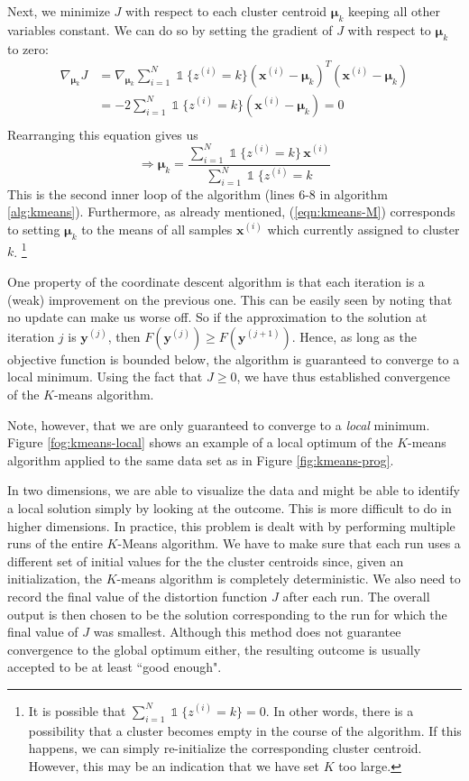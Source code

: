 \documentclass[final,3p,times,twocolumn]{elsarticle}
\let\bs\boldsymbol
\DeclareMathOperator*{\id}{\mathds{1}}
\begin{document}
Next, we minimize $J$ with respect to each cluster centroid $\bs\mu_k$ keeping all other variables constant.
We can do so by setting the gradient of $J$ with respect to $\bs\mu_k$ to zero:
\begin{equation}
\label{eqn:kmeans-M0}
\begin{split}
\nabla_{\bs\mu_k} J &= \nabla_{\bs\mu_k} \sum_{i=1}^N\id\{z^{(i)}=k\}(\bs x^{(i)}-\bs\mu_k)^T(\bs x^{(i)}-\bs\mu_k)\\
&= -2 \sum_{i=1}^N\id\{z^{(i)}=k\}(\bs x^{(i)}-\bs\mu_k) = 0\\
\end{split}
\end{equation}
Rearranging this equation gives us
\begin{equation}
\label{eqn:kmeans-M}
\Rightarrow \bs\mu_k = \frac{\sum_{i=1}^N\id\{z^{(i)} = k\}\,\bs x^{(i)}}{\sum_{i=1}^N\id\{z^{(i)}=k}
\end{equation}
This is the second inner loop of the algorithm (lines 6-8 in algorithm \ref{alg:kmeans}).
Furthermore, as already mentioned, (\ref{eqn:kmeans-M}) corresponds to setting $\bs \mu_k$ to the means of all samples $\bs x^{(i)}$ which currently assigned to cluster $k$.
\footnote{It is possible that $\sum_{i=1}^N\id\{z^{(i)}=k\} = 0$.
In other words, there is a possibility that a cluster becomes empty in the course of the algorithm.
If this happens, we can simply re-initialize the corresponding cluster centroid.
However, this may be an indication that we have set $K$ too large.}

One property of the coordinate descent algorithm is that each iteration is a (weak) improvement on the previous one.
This can be easily seen by noting that no update can make us worse off. 
So if the approximation to the solution at iteration $j$ is $\bs y^{(j)}$, then $F(\bs y^{(j)}) \geq F(\bs y^{(j+1)})$.
Hence, as long as the objective function is bounded below, the algorithm is guaranteed to converge to a local minimum.
Using the fact that $J \geq 0$, we have thus established convergence of the $K$-means algorithm.

Note, however, that we are only guaranteed to converge to a \emph{local} minimum.
Figure \ref{fog:kmeans-local} shows an example of a local optimum of the $K$-means algorithm applied to the same data set as in Figure \ref{fig:kmeans-prog}.

In two dimensions, we are able to visualize the data and might be able to identify a local solution simply by looking at the outcome. 
This is more difficult to do in higher dimensions.
In practice, this problem is dealt with by performing multiple runs of the entire $K$-Means algorithm.
We have to make sure that each run uses a different set of initial values for the the cluster centroids since, given an initialization, the $K$-means algorithm is completely deterministic.
We also need to record the final value of the distortion function $J$ after each run.
The overall output is then chosen to be the solution corresponding to the run for which the final value of $J$ was smallest.
Although this method does not guarantee convergence to the global optimum either, the resulting outcome is usually accepted to be at least ``good enough".
\end{document}
